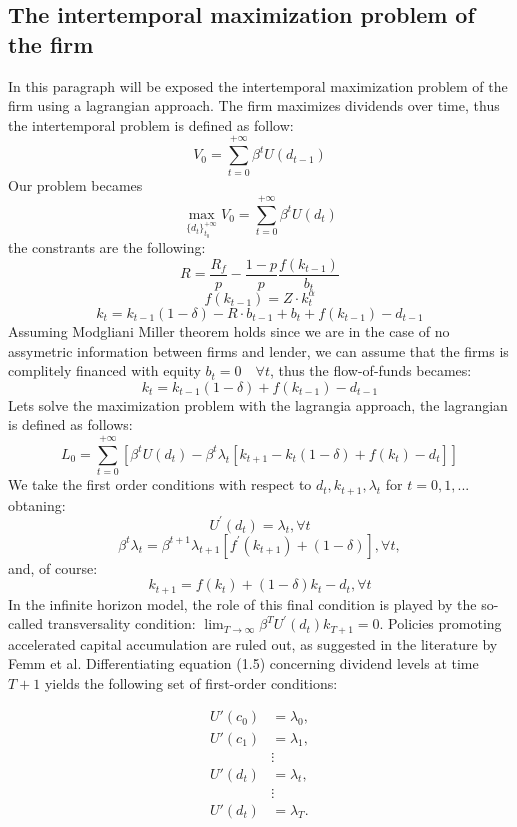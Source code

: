 \documentclass[12pt]{article}
\begin{document}
\subsection{The intertemporal maximization problem of the firm}
In this paragraph will be exposed the intertemporal maximization problem of the firm using a lagrangian approach.
The firm maximizes dividends over time, thus the intertemporal problem is defined as follow:
\[V_0 = \sum_{t=0}^{+\infty}{\beta^t U(d_{t-1})}\]
Our problem becames 
\[\max_{{\{d_{t}\}}^{+\infty}_{t_0}}V_0 = \sum_{t=0}^{+\infty}{\beta^t U(d_t)}\]
the constrants are the following:
\[R=\frac{R_f}{p}  -\frac{ 1-p }{ p }\frac{f(k_{t-1})}{b_t}\]
\[f(k_{t-1}) = Z \cdot k_t^\alpha\]
\[k_t = k_{t-1}(1 - \delta) - R \cdot b_{t-1} + b_{t} + f(k_{t-1}) - d_{t-1}\]
Assuming Modgliani Miller theorem holds since we are in the case of no assymetric information between firms and lender,
we can assume that the firms is complitely financed with equity \(b_t=0 \quad \forall t\), thus the flow-of-funds
becames:
\[k_t = k_{t-1}(1 - \delta)+ f(k_{t-1}) - d_{t-1}\]
Lets solve the maximization problem with the lagrangia approach, the lagrangian is defined as follows:
\[L_0 = \sum_{t=0}^{+\infty}\left[{\beta^t U(d_t) - \beta^t \lambda_t\left[k_{t+1} - k_{t}(1 - \delta)+ f(k_t) -
d_t\right]}\right] \]
We take the first order conditions with respect to \(d_{t}, k_{t+1}, \lambda_t\) for \(t=0,1,...\) obtaning:
\[
U^{\prime}\left(d_{t}\right)=\lambda_t, \forall t
\]
\[
\beta^t \lambda_t=\beta^{t+1} \lambda_{t+1}\left[f^{\prime}\left(k_{t+1}\right)+(1-\delta)\right], \forall t,
\]
and, of course:
\[
k_{t+1}=f\left(k_t\right)+(1-\delta) k_t-d_{t}, \forall t
\]
In the infinite horizon model, the role of this final
condition is played by the so-called transversality condition:
$\lim _{T \rightarrow \infty} \beta^T U^{\prime}\left(d_{t}\right) k_{T+1}=0$.
Policies promoting accelerated capital accumulation are ruled out, as suggested in the literature by Femm et al.
Differentiating  equation (1.5) concerning dividend levels at time \(T+1\) yields the following set of first-order
conditions:

\begin{equation}
    \begin{aligned}
    U'(c_0) &= \lambda_0, \\
    U'(c_1) &= \lambda_1, \\
    & \vdots \\
    U'(d_{t}) &= \lambda_t, \\
    & \vdots \\
    U'(d_{t}) &= \lambda_T.
    \end{aligned}
\end{equation}
\end{document}

